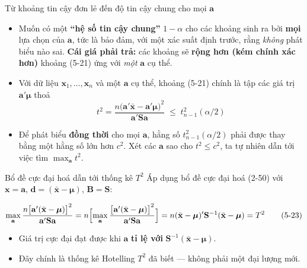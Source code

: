\begin{frame}{Từ khoảng tin cậy đơn lẻ đến độ tin cậy chung cho mọi $\mathbf a$}
\begin{itemize}
  \item Muốn có một \textbf{``hệ số tin cậy chung''} $1-\alpha$ cho các khoảng
        sinh ra bởi \textbf{mọi} lựa chọn của $\mathbf a$, tức là bảo đảm, với
        một xác suất định trước, rằng \emph{không} phát biểu nào sai.
        \textbf{Cái giá phải trả:} các khoảng sẽ \textbf{rộng hơn (kém chính
        xác hơn)} khoảng (5-21) ứng với \emph{một} $\mathbf a$ cụ thể.
  \item Với dữ liệu $\mathbf x_1,\ldots,\mathbf x_n$ và một $\mathbf a$ cụ thể,
        khoảng (5-21) chính là tập các giá trị $\mathbf a'\boldsymbol\mu$ thoả
\[
t^2=\frac{n\bigl(\mathbf a'\bar{\mathbf x}-\mathbf a'\boldsymbol\mu\bigr)^2}{\mathbf a'\mathbf S\mathbf a}
\;\le\; t^2_{n-1}(\alpha/2)
\tag{5-22}
\]
  \item Để phát biểu \textbf{đồng thời} cho mọi $\mathbf a$, hằng số
        $t^2_{n-1}(\alpha/2)$ phải được thay bằng một hằng số lớn hơn $c^2$.
        Xét các $\mathbf a$ sao cho $t^2\le c^2$, ta tự nhiên dẫn tới việc tìm
        $\displaystyle\max_{\mathbf a} t^2$.
\end{itemize}
\end{frame}

\begin{frame}{Bổ đề cực đại hoá dẫn tới thống kê $T^2$}
Áp dụng bổ đề cực đại hoá (2-50) với $\mathbf x=\mathbf a$, $\mathbf d=(\bar{\mathbf x}-\boldsymbol\mu)$, $\mathbf B=\mathbf S$:

\begin{keyformula}
{\small
\[
\max_{\mathbf a}\frac{n\bigl[\mathbf a'(\bar{\mathbf x}-\boldsymbol\mu)\bigr]^2}{\mathbf a'\mathbf S\mathbf a}
= n\Bigl[\max_{\mathbf a}\frac{\bigl[\mathbf a'(\bar{\mathbf x}-\boldsymbol\mu)\bigr]^2}{\mathbf a'\mathbf S\mathbf a}\Bigr]
= n(\bar{\mathbf x}-\boldsymbol\mu)'\mathbf S^{-1}(\bar{\mathbf x}-\boldsymbol\mu)
= T^2
\tag{5-23}
\]
}
\end{keyformula}

\begin{itemize}
  \item Giá trị cực đại đạt được khi $\mathbf a$ \textbf{tỉ lệ với} $\mathbf S^{-1}(\bar{\mathbf x}-\boldsymbol\mu)$.
  \item Đây chính là thống kê Hotelling $T^2$ đã biết — không phải một đại lượng mới.
\end{itemize}
\end{frame}

